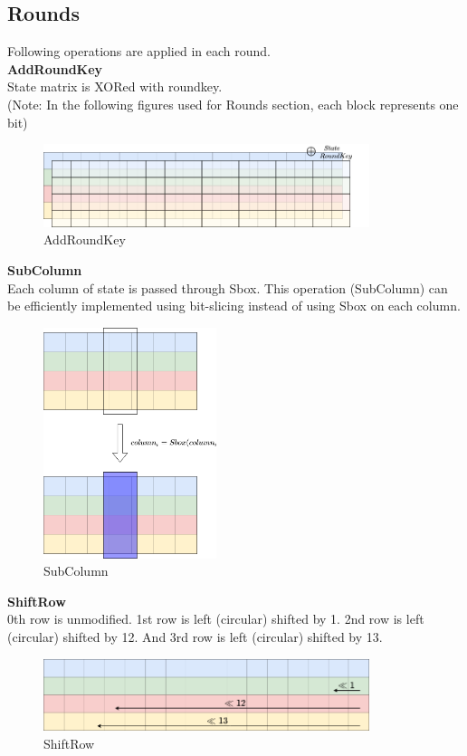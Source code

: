 \documentclass[final]{transcrypto}
\begin{document}
\subsection{Rounds}
\label{Rounds}
Following operations are applied in each round.\\
\textbf{AddRoundKey}\\
State matrix is XORed with roundkey.\\
(Note: In the following figures used for Rounds section, each block represents one bit)
\begin{figure}[H]
\caption{AddRoundKey}
\centering
\includegraphics[width=0.85\textwidth]{images/round_xor.png}
\end{figure}
\hspace*{-0.64cm} \textbf{SubColumn}\\
Each column of state is passed through Sbox. This operation (SubColumn) can be efficiently implemented using bit-slicing instead of using Sbox on each column.\\
\begin{figure}[H]
\caption{SubColumn}
\centering
\includegraphics[width=0.45\textwidth]{images/round_sbox.png}
\end{figure}
\hspace*{-0.5cm}\textbf{ShiftRow}\\
0th row is unmodified. 1st row is left (circular) shifted by 1. 2nd row is left (circular) shifted by 12. And 3rd row is left (circular) shifted by 13.\\
\begin{figure}[H]
\caption{ShiftRow}
\centering
\includegraphics[width=0.85\textwidth]{images/round_shift.png}
\end{figure}
\end{document}
